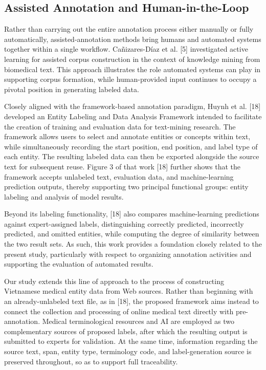 \documentclass[runningheads]{llncs}
\begin{document}
\subsection{Assisted Annotation and Human-in-the-Loop}
Rather than carrying out the entire annotation process either manually or fully automatically, assisted-annotation methods bring humans and automated systems together within a single workflow. Cañizares-Díaz et al. [5] investigated active learning for assisted corpus construction in the context of knowledge mining from biomedical text. This approach illustrates the role automated systems can play in supporting corpus formation, while human-provided input continues to occupy a pivotal position in generating labeled data.

Closely aligned with the framework-based annotation paradigm, Huynh et al. [18] developed an Entity Labeling and Data Analysis Framework intended to facilitate the creation of training and evaluation data for text-mining research. The framework allows users to select and annotate entities or concepts within text, while simultaneously recording the start position, end position, and label type of each entity. The resulting labeled data can then be exported alongside the source text for subsequent reuse. Figure 3 of that work [18] further shows that the framework accepts unlabeled text, evaluation data, and machine-learning prediction outputs, thereby supporting two principal functional groups: entity labeling and analysis of model results.

Beyond its labeling functionality, [18] also compares machine-learning predictions against expert-assigned labels, distinguishing correctly predicted, incorrectly predicted, and omitted entities, while computing the degree of similarity between the two result sets. As such, this work provides a foundation closely related to the present study, particularly with respect to organizing annotation activities and supporting the evaluation of automated results.

Our study extends this line of approach to the process of constructing Vietnamese medical entity data from Web sources. Rather than beginning with an already-unlabeled text file, as in [18], the proposed framework aims instead to connect the collection and processing of online medical text directly with pre-annotation. Medical terminological resources and AI are employed as two complementary sources of proposed labels, after which the resulting output is submitted to experts for validation. At the same time, information regarding the source text, span, entity type, terminology code, and label-generation source is preserved throughout, so as to support full traceability.
\end{document}
